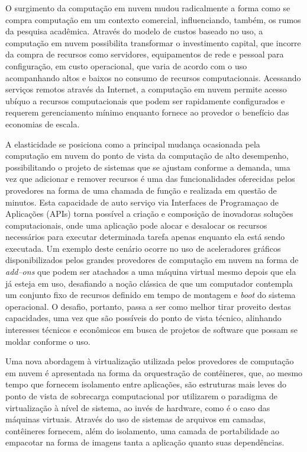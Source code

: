 \documentclass[english,brazilian]{UNISINOSmonografia} %
\begin{document}
O surgimento da computação em nuvem mudou radicalmente a forma como se compra computação em um contexto comercial, influenciando, também, os rumos da pesquisa acadêmica.
Através do modelo de custos baseado no uso, a computação em nuvem possibilita transformar o investimento capital, que incorre da compra de recursos como servidores, equipamentos de rede e pessoal para configuração, em custo operacional, que varia de acordo com o uso acompanhando altos e baixos no consumo de recursos computacionais.
Acessando serviços remotos através da Internet, a computação em nuvem permite acesso ubíquo a recursos computacionais que podem ser rapidamente configurados e requerem gerenciamento mínimo enquanto fornece ao provedor o benefício das economias de escala.


A elasticidade se posiciona como a principal mudança ocasionada pela computação em nuvem do ponto de vista da computação de alto desempenho, possibilitando o projeto de sistemas que se ajustam conforme a demanda, uma vez que adicionar e remover recursos é uma das funcionalidades oferecidas pelos provedores na forma de uma chamada de função e realizada em questão de minutos.
Esta capacidade de auto serviço via Interfaces de Programaçao de Aplicações (APIs) torna possível a criação e composição de inovadoras soluções computacionais, onde uma aplicação pode alocar e desalocar os recursos necessários para executar determinada tarefa apenas enquanto ela está sendo executada.
Um exemplo deste cenário ocorre no uso de aceleradores gráficos disponibilizados pelos grandes provedores de computação em nuvem na forma de \textit{add--ons} que podem ser atachados a uma máquina virtual mesmo depois que ela já esteja em uso, desafiando a noção clássica de que um computador contempla um conjunto fixo de recursos definido em tempo de montagem e \textit{boot} do sistema operacional.
O desafio, portanto, passa a ser como melhor tirar proveito destas capacidades, uma vez que são possíveis do ponto de vista técnico, alinhando interesses técnicos e econômicos em busca de projetos de software que possam se moldar conforme o uso.


Uma nova abordagem à virtualização utilizada pelos provedores de computação em nuvem é apresentada na forma da orquestração de contêineres, que, ao mesmo tempo que fornecem isolamento entre aplicações, são estruturas mais leves do ponto de vista de sobrecarga computacional por utilizarem o paradigma de virtualização à nível de sistema, ao invés de hardware, como é o caso das máquinas virtuais.
Através do uso de sistemas de arquivos em camadas, contêineres fornecem, além do isolamento, uma camada de portabilidade ao empacotar na forma de imagens tanta a aplicação quanto suas dependências.
\end{document}
